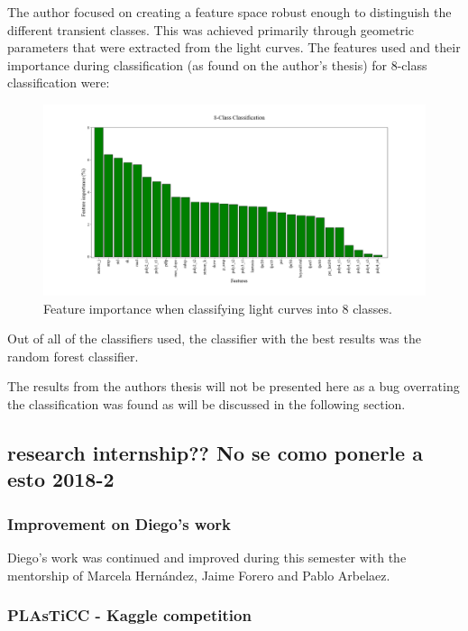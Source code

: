 The author focused on creating a feature space robust enough to distinguish the different transient classes. This was achieved primarily through geometric parameters that were extracted from the light curves. The features used and their importance during classification (as found on the author's thesis) for 8-class classification were: 

\begin{figure}[H]
  \centering
  \includegraphics[width=1.05\textwidth]{images/importances.png}
  \caption{Feature importance when classifying light curves into 8 classes.}
\end{figure}

Out of all of the classifiers used, the classifier with the best results was the random forest classifier. 

The results from the authors thesis will not be presented here as a bug overrating the classification was found as will be discussed in the following section.

\subsection{research internship?? No se como ponerle a esto 2018-2}

\subsubsection{Improvement on Diego's work}\label{improvementDiego}
Diego's work was continued and improved during this semester with the mentorship of Marcela Hern\'andez, Jaime Forero and Pablo Arbelaez. 

\subsubsection{PLAsTiCC - Kaggle competition}


